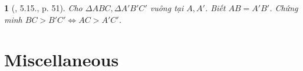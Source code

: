 \documentclass{article}
\newtheorem{baitoan}{}
\begin{document}
\begin{baitoan}[\cite{Hung_Mai_Toan_7_hinh_hoc}, 5.15., p. 51]
	Cho $\Delta ABC,\Delta A'B'C'$ vuông tại $A,A'$. Biết $AB = A'B'$. Chứng minh $BC > B'C'\Leftrightarrow AC > A'C'$.
\end{baitoan}

%	
%
%	
%
%	


\section{Miscellaneous}


\printbibliography[heading=bibintoc]
	
\end{document}

